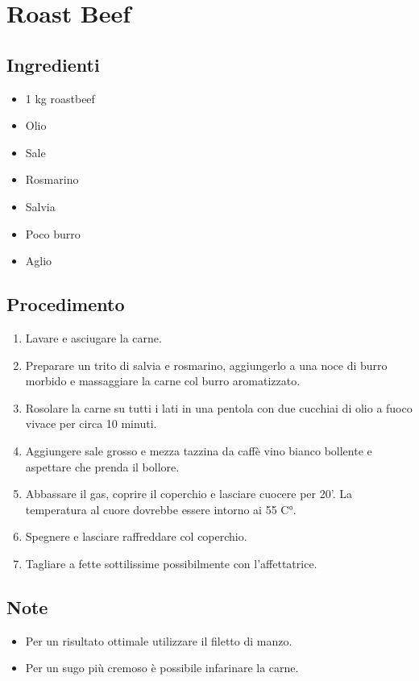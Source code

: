 \section{Roast Beef}
\subsection{Ingredienti}
\begin{itemize}
\item 1 kg roastbeef  
\item Olio  
\item Sale  
\item Rosmarino  
\item Salvia  
\item Poco burro  
\item Aglio
\end{itemize}
\subsection{Procedimento}
\begin{enumerate}
\item  Lavare e asciugare la carne.  
\item  Preparare un trito di salvia e rosmarino, aggiungerlo a una noce di burro morbido e massaggiare la carne col burro aromatizzato.  
\item  Rosolare la carne su tutti i lati in una pentola con due cucchiai di olio a fuoco vivace per circa 10 minuti.  
\item  Aggiungere sale grosso e mezza tazzina da caffè vino bianco bollente e aspettare che prenda il bollore.  
\item  Abbassare il gas, coprire il coperchio e lasciare cuocere per 20'. La temperatura al cuore dovrebbe essere intorno ai 55 C°.  
\item  Spegnere e lasciare raffreddare col coperchio.  
\item  Tagliare a fette sottilissime possibilmente con l'affettatrice.
\end{enumerate}
\subsection{Note}
\begin{itemize}
\item Per un risultato ottimale utilizzare il filetto di manzo.  
\item Per un sugo più cremoso è possibile infarinare la carne.
\end{itemize}
